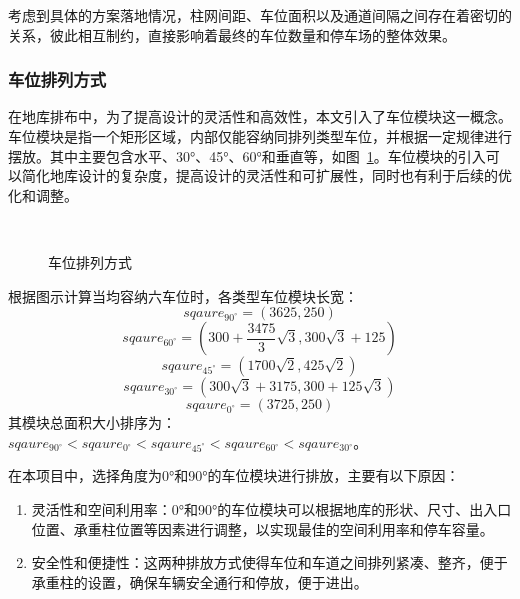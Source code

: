 考虑到具体的方案落地情况，柱网间距、车位面积以及通道间隔之间存在着密切的关系，彼此相互制约，直接影响着最终的车位数量和停车场的整体效果。
\subsubsection{车位排列方式}
在地库排布中，为了提高设计的灵活性和高效性，本文引入了车位模块\cite{1020726891.nh}这一概念。车位模块是指一个矩形区域，内部仅能容纳同排列类型车位，并根据一定规律进行摆放。其中主要包含水平、30°、45°、60°和垂直等，如图~\ref{fig:car_paving}。车位模块的引入可以简化地库设计的复杂度，提高设计的灵活性和可扩展性，同时也有利于后续的优化和调整。
\begin{figure}[!htb]
	\centering  
	\subfigure[${45}^\circ$排布]{
		}
	\subfigure[${30}^\circ$排布]{
		}
	  \\
	\subfigure[竖直排布]{
		}
	\subfigure[${60}^\circ$排布]{
		}
	\subfigure[水平排布]{
		}
	\caption{车位排列方式}
    \label{fig:car_paving}
\end{figure}

根据图示计算当均容纳六车位时，各类型车位模块长宽：
\begin{equation}
    sqaure_{90^\circ} = (3625,250) 
\end{equation}
\begin{equation}
    sqaure_{60^\circ} = (300 + \frac{3475}{3}\sqrt{3},300\sqrt{3}+125) 
\end{equation}
\begin{equation}
    sqaure_{45^\circ} = (1700\sqrt{2}, 425\sqrt{2})
\end{equation}
\begin{equation}
    sqaure_{30^\circ} = (300\sqrt{3}+3175,300+125\sqrt{3}) 
\end{equation}
\begin{equation}
    sqaure_{0^\circ} = (3725,250)
\end{equation}
其模块总面积大小排序为：$sqaure_{90^\circ}<sqaure_{0^\circ}<sqaure_{45^\circ}<sqaure_{60^\circ}<sqaure_{30^\circ}$。

在本项目中，选择角度为0°和90°的车位模块进行排放，主要有以下原因：

\begin{enumerate}
\item 灵活性和空间利用率：0°和90°的车位模块可以根据地库的形状、尺寸、出入口位置、承重柱位置等因素进行调整，以实现最佳的空间利用率和停车容量。
\item 安全性和便捷性：这两种排放方式使得车位和车道之间排列紧凑、整齐，便于承重柱的设置，确保车辆安全通行和停放，便于进出。
\end{enumerate}

